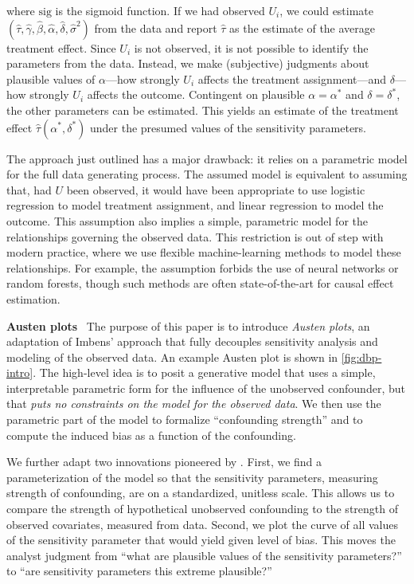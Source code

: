 \documentclass{article}
\DeclareRobustCommand{\parhead}[1]{\textbf{#1}~}
\begin{document}
where $\mathrm{sig}$ is the sigmoid function.
If we had observed $U_{i}$, we could estimate $(\hat{\tau},\hat{\gamma},\hat{\beta},\hat{\alpha},\hat{\delta},\hat{\sigma}^{2})$
from the data
%
and report $\hat{\tau}$
as the estimate of the average treatment effect. 
Since $U_{i}$ is not observed, it is not possible to identify the
parameters from the data. Instead, we make (subjective) judgments
about plausible values of $\alpha$---how
strongly $U_{i}$ affects the treatment assignment---and
$\delta$---how strongly $U_{i}$ affects the outcome.
Contingent on plausible $\alpha=\alpha^{*}$ and $\delta=\delta^{*}$,
the other parameters can be estimated.
This yields an estimate of the treatment effect $\hat{\tau}(\alpha^{*},\delta^{*})$
under the presumed values of the sensitivity parameters.

%
%
%

%
%
%
%
%
%
%
%
%
%
%

The approach just outlined has a major drawback:
it relies on a parametric model for the full data generating process. 
The assumed model is equivalent to assuming that, had $U$ been observed,
it would have been appropriate to use logistic regression to model
treatment assignment, and linear regression to model the outcome.
This assumption also implies a simple, parametric model for the relationships
governing the observed data.
This restriction is out of step with modern practice, where we use flexible machine-learning
methods to model these relationships. For example, the assumption
forbids the use of neural networks or random forests, though such
methods are often state-of-the-art for causal effect estimation.
%
%
%
%
%
%
%
%
%


\parhead{Austen plots} The purpose of this paper is to introduce \emph{Austen plots},
an adaptation of Imbens' approach that fully decouples
sensitivity analysis and modeling of the observed data. 
An example Austen plot is shown in \cref{fig:dbp-intro}.
The high-level idea is to posit a generative model
that uses a simple, interpretable parametric form for the
influence of the unobserved confounder, but
that \emph{puts no constraints on the model for the observed data}.
We then use the parametric part of the model to
formalize ``confounding strength'' and to compute the induced bias
as a function of the confounding.

We further adapt two innovations pioneered by \citet{Imbens:2003}.
First, we find a parameterization of the model so that the
sensitivity parameters, measuring strength of confounding,
are on a standardized, unitless scale.
This allows us to compare the strength of hypothetical unobserved confounding
to the strength of observed covariates, measured from data.
Second, we plot the curve
of all values of the sensitivity parameter that would yield given level of bias.
This moves the analyst judgment from ``what are
plausible values of the sensitivity parameters?'' to ``are sensitivity
parameters this extreme plausible?''
\end{document}
